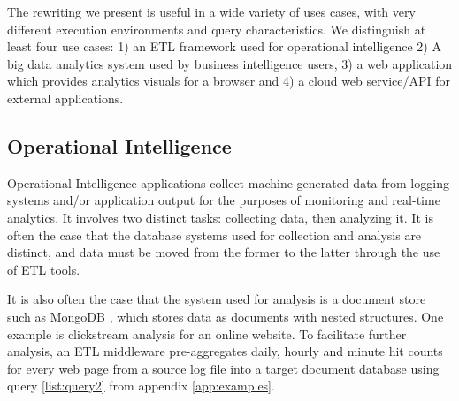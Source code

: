 The rewriting we present is useful in a wide variety of uses cases, with very different execution environments and query characteristics. We distinguish at least four use cases: 1) an ETL framework used for operational intelligence 2) A big data analytics system used by business intelligence users, 3) a web application which provides analytics visuals for a browser and 4) a cloud web service/API for external applications.


\subsection{Operational Intelligence}

Operational Intelligence applications collect machine generated data from logging systems and/or application output for the purposes of monitoring and real-time analytics. It involves two distinct tasks: collecting data, then analyzing it. It is often the case that the database systems used for collection and analysis are distinct, and data must be moved from the former to the latter through the use of ETL tools. 
% 

It is also often the case that the system used for analysis is a document store such as MongoDB , which stores data as documents with nested structures. One example is clickstream analysis for an online website. To facilitate further analysis, an ETL middleware pre-aggregates daily, hourly and minute hit counts for every web page from a source log file into a target document database using query \ref{list:query2} from appendix \ref{app:examples}. 


